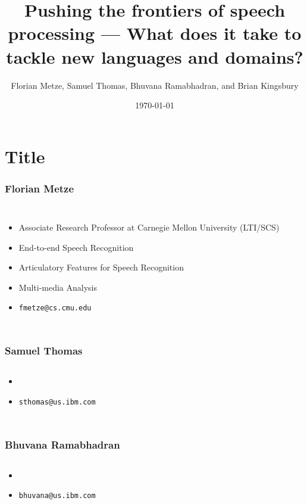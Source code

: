 \documentclass[12pt,xcolor=dvipsnames]{beamer}
\author{Florian Metze, Samuel Thomas, Bhuvana Ramabhadran, and Brian Kingsbury}
\title{{\color{Maroon} Pushing the frontiers of speech processing --- What does it take to tackle new languages and domains?}}
\institute{Carnegie Mellon University and IBM}
\date{\today}
\begin{document}
\section{Title}

\begin{frame}
  \titlepage
\end{frame}

\begin{frame}
  \frametitle{Florian Metze}
  \begin{columns}[T]
    \column{2in}
    \begin{itemize}
    \item Associate Research Professor at Carnegie Mellon University (LTI/SCS)
    \item End-to-end Speech Recognition
    \item Articulatory Features for Speech Recognition
    \item Multi-media Analysis
    \item \texttt{fmetze@cs.cmu.edu}
    \end{itemize}
    \column{2in}
  \end{columns}
\end{frame}

\begin{frame}
  \frametitle{Samuel Thomas}
  \begin{columns}[T]
    \column{2in}
    \begin{itemize}
    \item 
    \item \texttt{sthomas@us.ibm.com}
    \end{itemize}
    \column{2in}
  \end{columns}
\end{frame}

\begin{frame}
  \frametitle{Bhuvana Ramabhadran}
  \begin{columns}[T]
    \column{2in}
    \begin{itemize}
    \item 
    \item \texttt{bhuvana@us.ibm.com}
    \end{itemize}
    \column{2in}
  \end{columns}
\end{frame}
\end{document}
